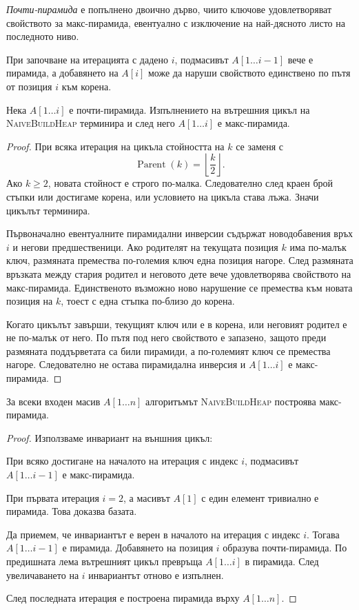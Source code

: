 \begin{defn}
\emph{Почти-пирамида} е попълнено двоично дърво, чиито ключове удовлетворяват свойството за макс-пирамида, евентуално с изключение на най-дясното листо на последното ниво.
\end{defn}

При започване на итерацията с дадено $i$, подмасивът $A[1\ldots i-1]$ вече е пирамида, а добавянето на $A[i]$ може да наруши свойството единствено по пътя от позиция $i$ към корена.

\begin{lem}
Нека $A[1\ldots i]$ е почти-пирамида. Изпълнението на вътрешния цикъл на \textsc{NaiveBuildHeap} терминира и след него $A[1\ldots i]$ е макс-пирамида.
\end{lem}

\begin{proof}
При всяка итерация на цикъла стойността на $k$ се заменя с
\[
\operatorname{Parent}(k)=\left\lfloor\frac k2\right\rfloor.
\]
Ако $k\geq 2$, новата стойност е строго по-малка. Следователно след краен брой стъпки или достигаме корена, или условието на цикъла става лъжа. Значи цикълът терминира.

Първоначално евентуалните пирамидални инверсии съдържат новодобавения връх $i$ и негови предшественици. Ако родителят на текущата позиция $k$ има по-малък ключ, размяната премества по-големия ключ една позиция нагоре. След размяната връзката между стария родител и неговото дете вече удовлетворява свойството на макс-пирамида. Единственото възможно ново нарушение се премества към новата позиция на $k$, тоест с една стъпка по-близо до корена.

Когато цикълът завърши, текущият ключ или е в корена, или неговият родител е не по-малък от него. По пътя под него свойството е запазено, защото преди размяната поддърветата са били пирамиди, а по-големият ключ се премества нагоре. Следователно не остава пирамидална инверсия и $A[1\ldots i]$ е макс-пирамида.
\end{proof}

\begin{thm}
За всеки входен масив $A[1\ldots n]$ алгоритъмът \textsc{NaiveBuildHeap} построява макс-пирамида.
\end{thm}

\begin{proof}
Използваме инвариант на външния цикъл:

\medskip

\noindent При всяко достигане на началото на итерация с индекс $i$, подмасивът $A[1\ldots i-1]$ е макс-пирамида.

\medskip

При първата итерация $i=2$, а масивът $A[1]$ с един елемент тривиално е пирамида. Това доказва базата.

Да приемем, че инвариантът е верен в началото на итерация с индекс $i$. Тогава $A[1\ldots i-1]$ е пирамида. Добавянето на позиция $i$ образува почти-пирамида. По предишната лема вътрешният цикъл превръща $A[1\ldots i]$ в пирамида. След увеличаването на $i$ инвариантът отново е изпълнен.

След последната итерация е построена пирамида върху $A[1\ldots n]$.
\end{proof}

